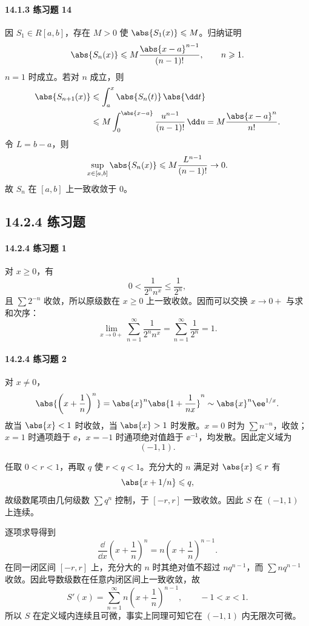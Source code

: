 \paragraph{14.1.3 练习题 14}
\begin{xsolution}
因 $S_1\in R[a,b]$，存在 $M>0$ 使 $\abs{S_1(x)}\leqslant M$。归纳证明
\[
  \abs{S_n(x)}\leqslant M\frac{\abs{x-a}^{n-1}}{(n-1)!},
  \qquad n\geqslant1.
\]
$n=1$ 时成立。若对 $n$ 成立，则
\[
\begin{aligned}
  \abs{S_{n+1}(x)}
  &\leqslant\int_a^x\abs{S_n(t)}\,\abs{\dd t}\\
  &\leqslant M\int_0^{\abs{x-a}}\frac{u^{n-1}}{(n-1)!}\,\dd u
  =M\frac{\abs{x-a}^n}{n!}.
\end{aligned}
\]
令 $L=b-a$，则
\[
  \sup_{x\in[a,b]}\abs{S_n(x)}
  \leqslant M\frac{L^{n-1}}{(n-1)!}\to0.
\]
故 $S_n$ 在 $[a,b]$ 上一致收敛于 $0$。
\end{xsolution}

\subsection*{14.2.4 练习题}

\paragraph{14.2.4 练习题 1}
\begin{xsolution}
对 $x\geqslant0$，有
\[
  0<\frac1{2^n n^x}\leqslant\frac1{2^n},
\]
且 $\sum 2^{-n}$ 收敛，所以原级数在 $x\geqslant0$ 上一致收敛。因而可以交换 $x\to0+$ 与求和次序：
\[
  \lim_{x\to0+}\sum_{n=1}^{\infty}\frac1{2^n n^x}
  =\sum_{n=1}^{\infty}\frac1{2^n}=1.
\]
\end{xsolution}

\paragraph{14.2.4 练习题 2}
\begin{xsolution}
对 $x\ne0$，
\[
  \abs{\left(x+\frac1n\right)^n}
  =\abs{x}^n\abs{1+\frac1{nx}}^n
  \sim\abs{x}^n\ee^{1/x}.
\]
故当 $\abs{x}<1$ 时收敛，当 $\abs{x}>1$ 时发散。$x=0$ 时为 $\sum n^{-n}$，收敛；$x=1$ 时通项趋于 $\ee$，$x=-1$ 时通项绝对值趋于 $\ee^{-1}$，均发散。因此定义域为
\[
  (-1,1).
\]

任取 $0<r<1$，再取 $q$ 使 $r<q<1$。充分大的 $n$ 满足对 $\abs{x}\leqslant r$ 有
\[
  \abs{x+1/n}\leqslant q,
\]
故级数尾项由几何级数 $\sum q^n$ 控制，于 $[-r,r]$ 一致收敛。因此 $S$ 在 $(-1,1)$ 上连续。

逐项求导得到
\[
  \frac{\dd}{\dd x}\left(x+\frac1n\right)^n
  =n\left(x+\frac1n\right)^{n-1}.
\]
在同一闭区间 $[-r,r]$ 上，充分大的 $n$ 时其绝对值不超过 $nq^{n-1}$，而 $\sum nq^{n-1}$ 收敛。因此导数级数在任意内闭区间上一致收敛，故
\[
  S'(x)=\sum_{n=1}^{\infty}n\left(x+\frac1n\right)^{n-1},
  \qquad -1<x<1.
\]
所以 $S$ 在定义域内连续且可微，事实上同理可知它在 $(-1,1)$ 内无限次可微。
\end{xsolution}


